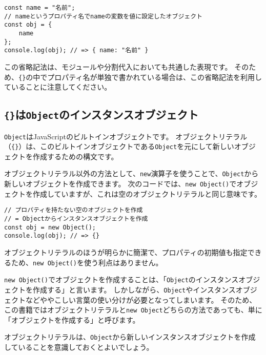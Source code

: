 \begin{lstlisting}
const name = "名前";
// nameというプロパティ名でnameの変数を値に設定したオブジェクト
const obj = {
    name
};
console.log(obj); // => { name: "名前" }
\end{lstlisting}

この省略記法は、モジュールや分割代入においても共通した表現です。
そのため、\texttt{\{\}}の中でプロパティ名が単独で書かれている場合は、この省略記法を利用していることに注意してください。

\hypertarget{object-instance-object}{%
\subsection{\texorpdfstring{\texttt{\{\}}は\texttt{Object}のインスタンスオブジェクト}{\{\}はObjectのインスタンスオブジェクト}}\label{object-instance-object}}

\texttt{Object}はJavaScriptのビルトインオブジェクトです。
オブジェクトリテラル（\texttt{\{\}}）は、このビルトインオブジェクトである\texttt{Object}を元にして新しいオブジェクトを作成するための構文です。

オブジェクトリテラル以外の方法として、\texttt{new}演算子を使うことで、\texttt{Object}から新しいオブジェクトを作成できます。
次のコードでは、\texttt{new Object()}でオブジェクトを作成していますが、これは空のオブジェクトリテラルと同じ意味です。

\begin{lstlisting}
// プロパティを持たない空のオブジェクトを作成
// = Objectからインスタンスオブジェクトを作成
const obj = new Object();
console.log(obj); // => {}
\end{lstlisting}

オブジェクトリテラルのほうが明らかに簡潔で、プロパティの初期値も指定できるため、\texttt{new Object()}を使う利点はありません。

\texttt{new Object()}でオブジェクトを作成することは、「\texttt{Object}のインスタンスオブジェクトを作成する」と言います。
しかしながら、\texttt{Object}やインスタンスオブジェクトなどややこしい言葉の使い分けが必要となってしまいます。
そのため、この書籍ではオブジェクトリテラルと\texttt{new Object}どちらの方法であっても、単に「オブジェクトを作成する」と呼びます。

オブジェクトリテラルは、\texttt{Object}から新しいインスタンスオブジェクトを作成していることを意識しておくとよいでしょう。

